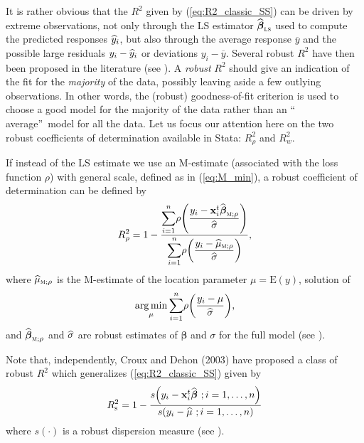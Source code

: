 It is rather obvious that the $R^{2}$ given by (\ref{eq:R2_classic_SS}) can be
driven by extreme observations, not only through the LS estimator
$\sthat{\boldsymbol\beta}_{\stsc{LS}}$ used to compute the predicted
responses $\widehat{y}_{i}$, but also through the average response
$\overline{y}$ and the possible large residuals $y_{i}-\widehat{y}_{i}$ or
deviations $y_{i}-\overline{y}$. Several robust $R^{2}$ have then been
proposed in the literature (see \citealp{Renaud:2010}). A
\emph{robust} $R^{2}$ should give an indication of the fit for the 
\emph{majority} of the data, possibly leaving aside a few outlying observations. In
other words, the (robust) goodness-of-fit criterion is used to choose a good
model for the majority of the data rather than an \textquotedblleft
average\textquotedblright\ model for all the data. Let us focus our attention
here on the two robust coefficients of determination available in Stata:
$R_{\rho}^{2}$ and $R_{w}^{2}$.

If instead of the LS estimate we use an M-estimate (associated with the loss
function $\rho$) with general scale, defined as in (\ref{eq:M_min}), a robust
coefficient of determination can be defined by
\begin{equation}
R_{\rho}^{2}=1-\frac{%
{\displaystyle\sum\limits_{i=1}^{n}}
\rho\left(  \dfrac{y_{i}-\stvec{x}_{i}^{t}\sthat{\boldsymbol\beta%
}_{\stsc{M};\rho}}{\sthat{\sigma}}\right)  }{%
{\displaystyle\sum\limits_{i=1}^{n}}
\rho\left(  \dfrac{y_{i}-\sthat{\mu}_{\stsc{M};\rho}}{\sthat{\sigma}%
}\right)  }, \label{eq:R2_rho}%
\end{equation}
where $\sthat{\mu}_{\stsc{M};\rho}$ is the M-estimate of the location
parameter $\mu=\mathrm{E}(y)$, solution of
\[
\argmin_{\mu}%
{\displaystyle\sum\limits_{i=1}^{n}}
\rho\left(  \dfrac{y_{i}-\mu}{\sthat{\sigma}}\right)  ,
\]
and $\sthat{\boldsymbol\beta}_{\stsc{M};\rho}$ and $\widehat{\sigma}$
are robust estimates of $\boldsymbol\beta$ and $\sigma$ for the full model
(see \citealp{maronna:etal:2006}).

Note that, independently, Croux and Dehon (2003) have proposed a class of
robust $R^{2}$ which generalizes (\ref{eq:R2_classic_SS}) given by
\begin{equation}
R_{\stsc{S}}^{2}=1-\frac{s\left(  y_{i}-\stvec{x}_{i}^{t}\widehat
{\boldsymbol\beta}\ ;i = 1, \dots, n\right)  }{s\left(  y_{i}-\sthat{\mu
}\ ;i = 1, \dots, n\right)  } \label{eq:R2_S}%
\end{equation}
where $s\left(  \cdot\right)  $ is a robust dispersion measure (see
\citealp{croux:dehon:2003}).

